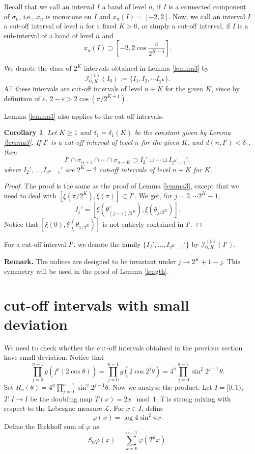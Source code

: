 \documentclass{amsart}
\newtheorem{cor}[thm]{Corollary}
\theoremstyle{definition}
\begin{document}
Recall that we call an interval $I$ a band of level $n$,
if $I$ is a connected component of $\sigma_n$, i.e.,
$x_n$ is monotone on $I$ and $x_n(I)=[-2,2]$.
Now, we call an interval $I$ a cut-off interval of level $n$ for a fixed $K>0$, 
or simply a cut-off interval,
if $I$ is a sub-interval of a  band of level $n$ and
$$x_n(I)\supset[-2,2\cos\frac{\pi}{2^{K+1}}].$$

We denote the class of $2^K$ intervals obtained in Lemma \ref{lemma3} by
$$\mathcal{I}_{0,K}^{(1)}(I_0):=\{I_1, I_2,\cdots I_{2^K}\}.$$
All these intervals are cut-off intervals of level $n+K$ for the given $K$, 
since by definition of $\varepsilon$, $2-\varepsilon>2\cos(\pi/2^{K+1}).$

Lemma \ref{lemma3} also applies to the cut-off intervals.
\begin{cor}
\label{lemma3'}
Let $K\ge1$ and $\delta_1=\delta_1(K)$ be the constant given by Lemma \ref{lemma3}. 
If $I'$ is a cut-off  interval of level $n$ for the given $K$, and $d(n,I')<\delta_1$, then
\begin{equation*}
I'\cap\sigma_{n+1}\cap\cdots\cap\sigma_{n+K}
\supset I_2'\sqcup\cdots\sqcup I_{2^K-1}',
\end{equation*}
    where $I_2',\ldots,I_{2^K-1}'$ are $2^{K}-2$ cut-off intervals of level $n+K$ for $K$.
\end{cor}

\begin{proof}
The proof is the same as the proof of Lemma \ref{lemma3}, except that
we need to deal with $[\xi({\pi}/{2^K}),\xi(\pi)]\subset I'$. 
We get, for $j=2,\cdots 2^{K}-1$,
\begin{equation*}
I_j'=[\xi(\theta^{+}_{(j-1)/2^K}),\xi(\theta^{-}_{j/2^K})].
\end{equation*}
Notice that $[\xi(0),\xi(\theta^{-}_{1/2^K})]$ is not entirely contained in $I'$.
\end{proof}
For a cut-off interval $I'$, we denote the family 
$\{I_2',\ldots,I_{2^K-1}'\}$ by $\mathcal I_{0,K}^{(1)}(I')$.

\noindent\textbf{Remark.} The indices are designed to be invariant under $j\to 2^{K}+1-j$.
This symmetry will be used in the proof of Lemma \ref{length}.


\section{cut-off intervals with small deviation}

We need to check whether the cut-off intervals obtained in the previous section have small deviation.
Notice that 
\begin{equation} 
\prod_{j=0}^{n-1}g(f^j(2\cos{\theta}))
=\prod_{j=0}^{n-1} g(2\cos{2^j\theta})
=4^n\prod_{j=0}^{n-1} \sin^2{2^{j-1}\theta}.
\end{equation}
Set $R_n(\theta)=4^n\prod_{j=0}^{n-1} \sin^2{2^{j-1}\theta}$.
Now we analyse the product.
Let $I=[0,1)$,  $T:I\to I$ be the doubling map $T(x)=2x \mod 1$. 
$T$ is strong mixing with respect to the Lebesgue measure $\mathcal{L}$. 
For $x\in I$, define
$$\varphi(x)=\log 4\sin^2\pi x.$$
Define the Birkhoff sum of $\varphi$ as 
$$S_n \varphi(x) = \sum_{k=0}^{n-1} \varphi(T^k x).$$
\end{document}
